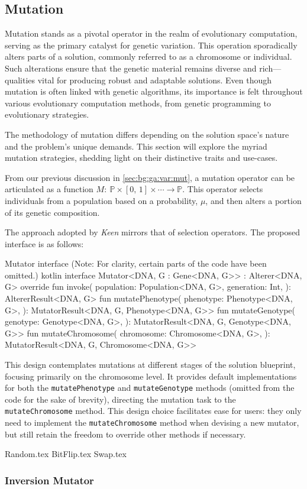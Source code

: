 \subsection{Mutation}
\label{sec:keen:op:mut}
  Mutation stands as a pivotal operator in the realm of evolutionary 
  computation, serving as the primary catalyst for genetic variation.
  This operation sporadically alters parts of a solution, commonly referred to 
  as a chromosome or individual. Such alterations ensure that the genetic 
  material remains diverse and rich—qualities vital for producing robust and 
  adaptable solutions. Even though mutation is often linked with genetic 
  algorithms, its importance is felt throughout various evolutionary 
  computation methods, from genetic programming to evolutionary strategies.

  The methodology of mutation differs depending on the solution space's nature 
  and the problem's unique demands. This section will explore the myriad 
  mutation strategies, shedding light on their distinctive traits and use-cases.

  From our previous discussion in \vref{sec:bg:ga:var:mut}, a mutation operator 
  can be articulated as a function \(M :\: \mathbb{P} \times [0,\, 1] \times 
  \cdots \to \mathbb{P}\). This operator selects individuals from a population 
  based on a probability, \(\mu\), and then alters a portion of its genetic 
  composition.

  The approach adopted by \textit{Keen} mirrors that of selection operators. 
  The proposed interface is as follows:

  \begin{code}{
      Mutator interface (Note: For clarity, certain parts of the code have been omitted.)
    }{}{kotlin}
      interface Mutator<DNA, G : Gene<DNA, G>> : Alterer<DNA, G> {
          override fun invoke(
              population: Population<DNA, G>,
              generation: Int,
          ): AltererResult<DNA, G>
          fun mutatePhenotype(
              phenotype: Phenotype<DNA, G>,
          ): MutatorResult<DNA, G, Phenotype<DNA, G>>
          fun mutateGenotype(
              genotype: Genotype<DNA, G>,
          ): MutatorResult<DNA, G, Genotype<DNA, G>>
          fun mutateChromosome(
              chromosome: Chromosome<DNA, G>,
          ): MutatorResult<DNA, G, Chromosome<DNA, G>>
      }
    \end{code}

  This design contemplates mutations at different stages of the solution 
  blueprint, focusing primarily on the chromosome level. It provides default 
  implementations for both the \texttt{mutatePhenotype} and 
  \texttt{mutateGenotype} methods (omitted from the code for the sake of 
  brevity), directing the mutation task to the \texttt{mutateChromosome} 
  method. This design choice facilitates ease for users: they only need to 
  implement the \texttt{mutateChromosome} method when devising a new mutator, 
  but still retain the freedom to override other methods if necessary.

  {Random.tex}
  {BitFlip.tex}
  {Swap.tex}
  

  \subsubsection{Inversion Mutator}
  \label{sec:keen:op:mut:inversion}
  \Blindtext
